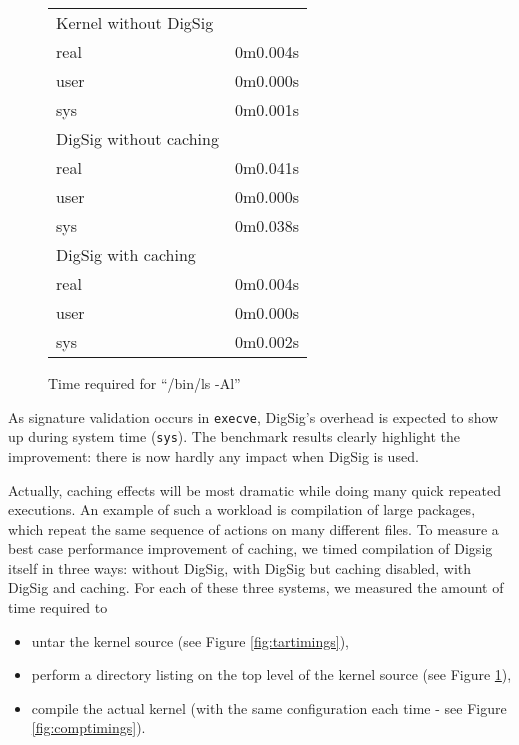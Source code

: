 \documentclass{article}
\begin{document}
\begin{figure}
\begin{center}
\begin{tabular}{|l|r|}
\hline
	Kernel without DigSig &  \\
	real  &  0m0.004s  \\
	user  &  0m0.000s  \\
	sys   &  0m0.001s  \\
\hline
	DigSig without caching &  \\
	real  &  0m0.041s \\
	user  &  0m0.000s  \\
	sys   &  0m0.038s  \\
\hline
	DigSig with caching &  \\
	real  &  0m0.004s \\
	user  &  0m0.000s \\
	sys   &  0m0.002s \\
\hline
\end{tabular}
\caption{Time required for ``/bin/ls -Al'' }
\label{fig:lstimings}
\end{center}
\end{figure}

As signature validation occurs
in \texttt{execve}, DigSig's overhead is expected to show up during system
time (\texttt{sys}).  The benchmark results clearly highlight the
improvement: there is now hardly any impact when DigSig is used.

Actually, caching effects will be most dramatic while doing many quick
repeated executions.  An example of such a workload is compilation of
large packages, which repeat the same sequence of actions on many different
files. 
To measure a best case performance improvement of
caching, we timed compilation of Digsig itself in three ways: without DigSig,
with DigSig but caching disabled, with DigSig and caching. For
each of these three systems, we measured the amount of time required to
\begin{itemize}
\item untar the kernel source (see Figure \ref{fig:tartimings}),
\item perform a directory listing on the top level of the kernel source (see Figure \ref{fig:lstimings}),
\item compile the actual kernel (with the same configuration each time - see Figure \ref{fig:comptimings}).
\end{itemize}
\end{document}
